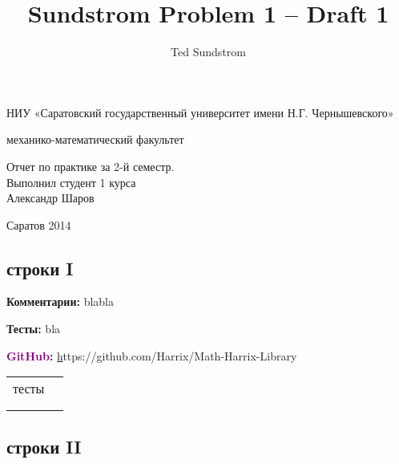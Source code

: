\documentclass[a4paper,,titlepage]{report}
\title{Sundstrom Problem 1 -- Draft 1}
\author{Ted Sundstrom}
\newcommand{\gitlink}[1]{\textsf{\textbf {\textcolor{purple}{GitHub}:  }}\selectfont \href{}#1\par}
\newcommand{\comments}[1]{\textsf{\textbf {Комментарии:  }}#1\par}
\newcommand{\tests}[1]{\textsf{\textbf {Тесты:  }}#1\par}
\begin{document}
  \begin{center}
    \large

    \vspace{0.5cm}
НИУ «Саратовский государственный университет имени Н.Г. Чернышевского»

    \vspace{0.25cm}
    
    механико-математический факультет

    \vfill
    {\LARGE Отчет по практике за 2-й семестр.\\Выполнил студент 1 курса \\Александр Шаров}

    \vfill



  \bigskip
    
    Саратов 2014
\end{center}



\begin{center}

\end{center}

\newpage
\begin{center}\section{строки I}\end{center}
 
 \begin{flushleft}
\comments{bla\newline bla}
\tests{bla} 
\gitlink{https://github.com/Harrix/Math-Harrix-Library}


\begin{table}[h]
\begin{tabular}{|l|l|l}
\cline{1-2}
\multicolumn{2}{|l|}{тесты} &  \\ \cline{1-2}
           &           &  \\ \cline{1-2}
           &           &  \\ \cline{1-2}
\end{tabular}
\end{table}


\end{flushleft}


\begin{center}\section{строки II}\end{center}
 
\end{document}
